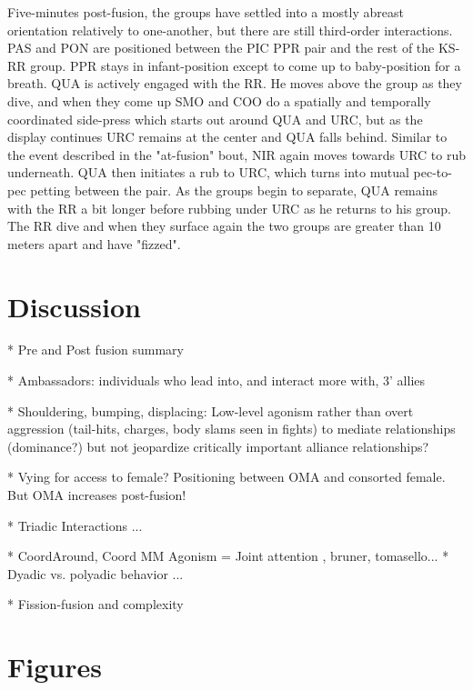 \documentclass[11pt]{amsart}
\begin{document}
Five-minutes post-fusion, the groups have settled into a mostly abreast orientation relatively to one-another, but there are still third-order interactions. PAS and PON are positioned between the PIC PPR pair and the rest of the KS-RR group. PPR stays in infant-position except to come up to baby-position for a breath. QUA is actively engaged with the RR. He moves above the group as they dive, and when they come up SMO and COO do a spatially and temporally coordinated side-press which starts out around QUA and URC, but as the display continues URC remains at the center and QUA falls behind. Similar to the event described in the "at-fusion" bout, NIR again moves towards URC to rub underneath. QUA then initiates a rub to URC, which turns into mutual pec-to-pec petting between the pair. As the groups begin to separate, QUA remains with the RR a bit longer before rubbing under URC as he returns to his group. The RR dive and when they surface again the two groups are greater than 10 meters apart and have "fizzed".

\section{Discussion}
* Pre and Post fusion summary 

* Ambassadors: individuals who lead into, and interact more with, 3' allies

* Shouldering, bumping, displacing: Low-level agonism rather than overt aggression (tail-hits, charges, body slams seen in fights) to mediate relationships (dominance?) but not jeopardize critically important alliance relationships? \citep{connor:2001}

* Vying for access to female? Positioning between OMA and consorted female. But OMA increases post-fusion!

* Triadic Interactions \citep{silk:1984}... 

* CoordAround, Coord MM Agonism =  Joint attention \citep{xitco:2001},  bruner, tomasello... 
* Dyadic vs. polyadic behavior \citep{kummer:1974} ... 

* Fission-fusion and complexity \citep{aureli:2008}

\section{Figures}
\end{document}
